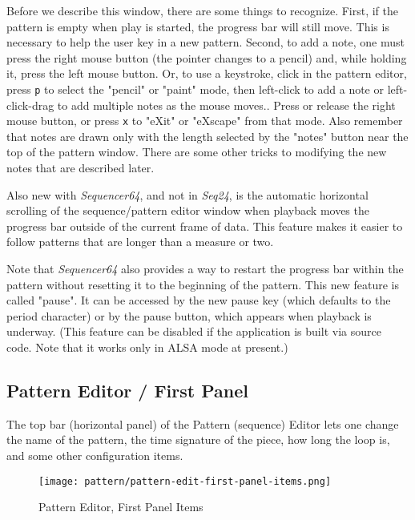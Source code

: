    Before we describe this window, there are some things to recognize.
   First, if the pattern is empty when play is started, the progress bar will
   still move.  This is necessary to help the user key in a new pattern.
   Second, to add a note, one must press the right mouse button (the pointer
   changes to a pencil) and, while holding it, press the left mouse button.
   Or, to use a keystroke, click in the pattern editor, press
   \texttt{p} to select the "pencil" or "paint" mode, then
   left-click to add a note or
   left-click-drag to add multiple notes as the mouse moves..
   Press or release the right mouse button, or press
   \texttt{x} to "eXit" or "eXscape" from that mode.  Also remember
   that notes are drawn only with the length selected by the "notes" button
   near the top of the pattern window.  There are some other tricks to
   modifying the new notes that are described later.

   Also new with \textsl{Sequencer64}, and not in \textsl{Seq24}, is the
   automatic horizontal scrolling of the sequence/pattern editor window when
   playback moves the progress bar outside of the current frame of data.  This
   feature makes it easier to follow patterns that are longer than a measure or
   two.
   
   Note that \textsl{Sequencer64} also provides a way to restart the progress
   bar within the pattern without resetting it to the beginning of the pattern.
    This new feature is called "pause".  It can be accessed by the
   new pause key (which defaults to the period character) or by the pause
   button, which appears when playback is underway.  (This feature
   can be disabled if the application is built via source code.  Note that
   it works only in ALSA mode at present.)

\subsection{Pattern Editor / First Panel}
\label{subsec:seq64_pattern_editor_first}

   The top bar (horizontal panel) of the Pattern (sequence) Editor
   lets one change the name of
   the pattern, the time signature of the piece, how long the loop is, and
   some other configuration items.

\begin{figure}[H]
   \centering 
   \texttt{[image: pattern/pattern-edit-first-panel-items.png]}
   \caption{Pattern Editor, First Panel Items}
   \label{fig:pattern_editor_first_panel_items}
\end{figure}

